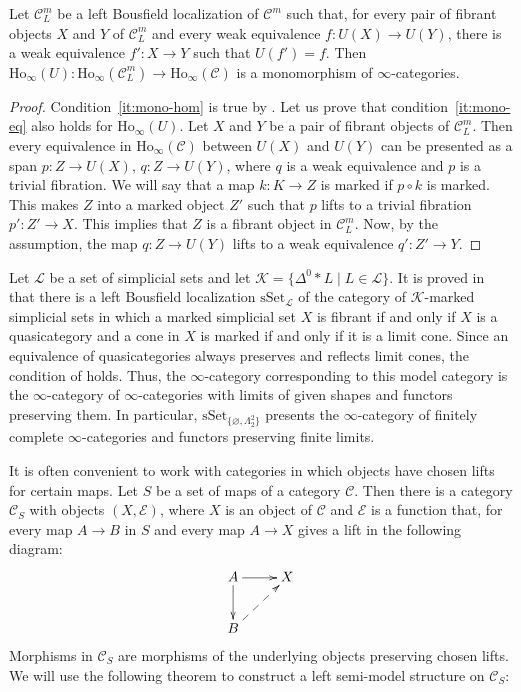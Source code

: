 \documentclass[reqno]{amsart}
\theoremstyle{definition}
\theoremstyle{remark}
\newcommand{\fs}[1]{\mathrm{#1}}
\newcommand{\Ho}{\fs{Ho}}
\newcommand{\cat}[1]{\mathcal{#1}}
\newcommand{\C}{\cat{C}}
\newcommand{\sSet}{\fs{sSet}}
\numberwithin{figure}{section}
\begin{document}
\begin{prop}
Let $\C^m_L$ be a left Bousfield localization of $\C^m$ such that, for every pair of fibrant objects $X$ and $Y$ of $\C^m_L$ and every weak equivalence $f : U(X) \to U(Y)$, there is a weak equivalence $f' : X \to Y$ such that $U(f') = f$.
Then $\Ho_\infty(U) : \Ho_\infty(\C^m_L) \to \Ho_\infty(\C)$ is a monomorphism of $\infty$-categories.
\end{prop}
\begin{proof}
Condition~\eqref{it:mono-hom} is true by .
Let us prove that condition~\eqref{it:mono-eq} also holds for $\Ho_\infty(U)$.
Let $X$ and $Y$ be a pair of fibrant objects of $\C^m_L$.
Then every equivalence in $\Ho_\infty(\C)$ between $U(X)$ and $U(Y)$ can be presented as a span $p : Z \to U(X)$, $q : Z \to U(Y)$, where $q$ is a weak equivalence and $p$ is a trivial fibration.
We will say that a map $k : K \to Z$ is marked if $p \circ k$ is marked.
This makes $Z$ into a marked object $Z'$ such that $p$ lifts to a trivial fibration $p' : Z' \to X$.
This implies that $Z$ is a fibrant object in $\C^m_L$.
Now, by the assumption, the map $q : Z \to U(Y)$ lifts to a weak equivalence $q' : Z' \to Y$.
\end{proof}

\begin{example}
Let $\mathcal{L}$ be a set of simplicial sets and let $\mathcal{K} = \{ \Delta^0 * L \mid L \in \mathcal{L} \}$.
It is proved in \cite[Proposition~4.1]{marked-obj} that there is a left Bousfield localization $\sSet_\mathcal{L}$ of the category of $\mathcal{K}$-marked simplicial sets
in which a marked simplicial set $X$ is fibrant if and only if $X$ is a quasicategory and a cone in $X$ is marked if and only if it is a limit cone.
Since an equivalence of quasicategories always preserves and reflects limit cones, the condition of  holds.
Thus, the $\infty$-category corresponding to this model category is the $\infty$-category of $\infty$-categories with limits of given shapes and functors preserving them.
In particular, $\sSet_{\{ \varnothing, \Lambda^2_2 \}}$ presents the $\infty$-category of finitely complete $\infty$-categories and functors preserving finite limits.
\end{example}


It is often convenient to work with categories in which objects have chosen lifts for certain maps.
Let $S$ be a set of maps of a category $\C$.
Then there is a category $\C_S$ with objects $(X,\mathcal{E})$, where $X$ is an object of $\C$ and $\mathcal{E}$ is a function that, for every map $A \to B$ in $S$ and every map $A \to X$ gives a lift in the following diagram:
\[ \xymatrix{ A \ar[r] \ar[d] & X \\
              B \ar@{-->}[ur]
            } \]
Morphisms in $\C_S$ are morphisms of the underlying objects preserving chosen lifts.
We will use the following theorem to construct a left semi-model structure on $\C_S$:
\end{document}
